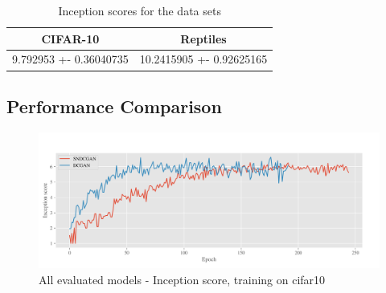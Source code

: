 \begin{table}[H]
\centering
\caption{Inception scores for the data sets}
\label{table:GS}
\begin{tabular}{c@{\hskip .5in} c}
\toprule
CIFAR-10                   & Reptiles   \\ 
\midrule
      9.792953 +- 0.36040735 & 10.2415905 +- 0.92625165 \\   

\bottomrule
\end{tabular}
\end{table}











\subsection{Performance Comparison}

\begin{figure}[h]
\centering
\includegraphics[width=\textwidth]{../code/results/figures/all_cifar10_is.png}
\caption{All evaluated models - Inception score, training on cifar10}
\label{fig:exp-all-is}
\end{figure}

